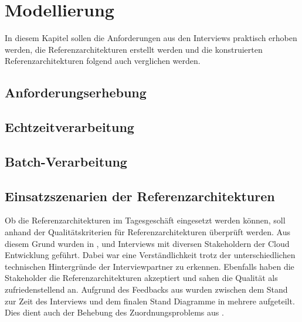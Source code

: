 \chapter{Modellierung}
In diesem Kapitel sollen die Anforderungen aus den Interviews praktisch erhoben werden, die Referenzarchitekturen erstellt werden und die konstruierten Referenzarchitekturen folgend auch verglichen werden.
\section{Anforderungserhebung}


\section{Echtzeitverarbeitung}\label{chap:ra-rt}


\section{Batch-Verarbeitung}\label{chap:ra-batch}


\section{Einsatzszenarien der Referenzarchitekturen}
Ob die Referenzarchitekturen im Tagesgeschäft eingesetzt werden können, soll anhand der Qualitätskriterien für Referenzarchitekturen überprüft werden. Aus diesem Grund wurden in  ,  und  Interviews mit diversen Stakeholdern der Cloud Entwicklung geführt. Dabei war eine Verständlichkeit trotz der unterschiedlichen technischen Hintergründe der Interviewpartner zu erkennen. Ebenfalls haben die Stakeholder die Referenzarchitekturen akzeptiert und sahen die Qualität als zufriedenstellend an. Aufgrund des Feedbacks aus  wurden zwischen dem Stand zur Zeit des Interviews und dem finalen Stand Diagramme in mehrere aufgeteilt. Dies dient auch der Behebung des Zuordnungsproblems aus .

